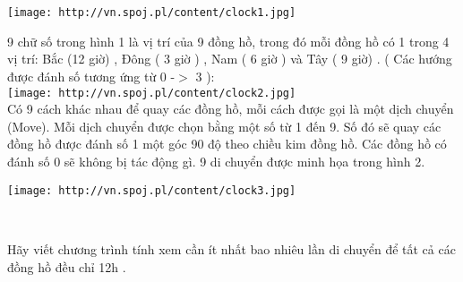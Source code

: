  

 


\texttt{[image: http://vn.spoj.pl/content/clock1.jpg]}

9 chữ số trong hình 1 là vị trí của 9 đồng hồ, trong đó mỗi đồng hồ có 1 trong 4 vị trí: Bắc (12 giờ) , Đông ( 3 giờ ) , Nam ( 6 giờ ) và Tây ( 9 giờ) . ( Các hướng được đánh số tương ứng từ 0 -$>$ 3 ):
\\
\texttt{[image: http://vn.spoj.pl/content/clock2.jpg]}
\\Có 9 cách khác nhau để quay các đồng hồ, mỗi cách được gọi là một dịch chuyển (Move). Mỗi dịch chuyển được chọn bằng một số từ 1 đến 9. Số đó sẽ quay các đồng hồ được đánh số 1 một góc 90 độ theo chiều kim đồng hồ. Các đồng hồ có đánh số 0 sẽ không bị tác động gì. 9 di chuyển được minh họa trong hình 2.


\texttt{[image: http://vn.spoj.pl/content/clock3.jpg]}

 

Hãy viết chương trình tính xem cần ít nhất bao nhiêu lần di chuyển để tất cả các đồng hồ đều chỉ 12h .

\
